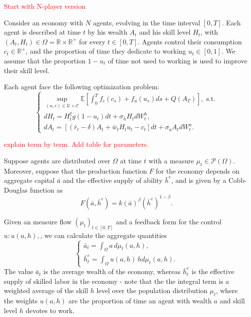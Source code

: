 
\textcolor{red}{Start with N-player version}

Consider an economy with $N$ agents, evolving in the time interval $[0,T]$.
Each agent is described at time $t$ by his wealth $A_t$ and his skill level $H_t$,
with $(A_t, H_t) \in \Omega = \mathbb{R} \times \mathbb{R}^+$ for every $t \in [0,T]$.
Agents control their consumption $c_t \in \mathbb{R}^+$, and the proportion of time they dedicate to working $u_t \in [0,1]$. 
We assume that the proportion $1 - u_t$ of time not used to working is used to improve their skill level. 

Each agent face the following optimization problem:
\begin{equation}
\begin{cases}
        \sup\limits_{(u,c) \in \mathcal{U} \times \mathcal{C}}\mathbb{E} [ \int_0^T f_c(c_s) + f_u(u_s) ds + Q(A_T) ], \text{ s.t.}\\
        d H_t = H^\xi_t g(1 - u_t) dt + \sigma_h H_t d W^h_t,\\
        d A_t = \left[ (\bar r_t - \delta) A_t + \bar w_t H_t u_t - c_t  \right] dt + \sigma_a A_t d W^a_t.
\end{cases}
\end{equation}


\textcolor{red}{explain term by term. Add table  for parameters.}

Suppose agents are distributed over $\Omega$ at time $t$ with a measure $\mu_t \in \mathcal{P}(\Omega)$.
Moreover, suppose that the production function $F$ for the economy depends on aggregate capital $\bar a$ and the effective supply of ability $\bar h^e$, and is given by a Cobb-Douglas function \cite{Add Refernce for Cobb-Douglas} as 
$$F(\bar a,\bar h^e) = k ({\bar a})^\beta ({\bar h^e})^{1-\beta}.$$

Given an measure flow $(\mu_t)_{t \in [0,T]}$ and a feedback form for the control $u: u(a,h), $, we can calculate the aggregate quantities
\begin{equation*}
    \begin{cases}
        \bar a_t = \int_\Omega a\, d\mu_t(a,h),\\
        \bar h^e_t = \int_\Omega u(a,h)\, h d\mu_t (a,h).
    \end{cases}
\end{equation*}
The value $\bar a_t$ is the average wealth of the economy, whereas $\bar h^e_t$ is the effective supply of skilled labor in the economy - note that the the integral term is a weighted average of the skill $h$ level over the population distribution $\mu_t$, where the weights $u(a,h)$ are the proportion of time an agent with wealth $a$ and skill level $h$ devotes to work.

